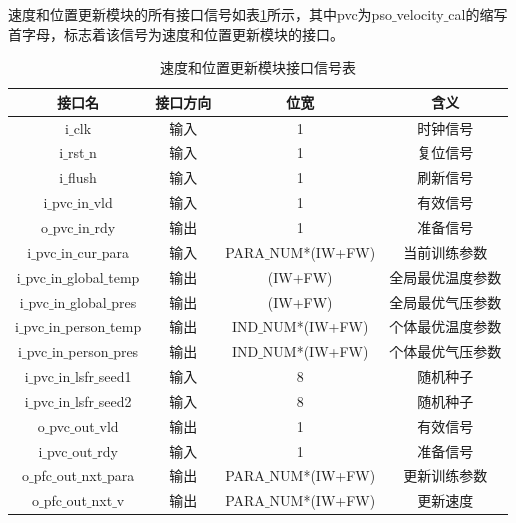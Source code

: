 速度和位置更新模块的所有接口信号如表\ref{tab:速度和位置更新模块接口信号表}所示，其中pvc为pso$\_$velocity$\_$cal的缩写首字母，标志着该信号为速度和位置更新模块的接口。

\begin{table}[htb]
    \centering
    \caption{速度和位置更新模块接口信号表}
    \label{tab:速度和位置更新模块接口信号表}
\begin{tabular}{c|c|c|c}
    \hline
    接口名                                          & 接口方向  & 位宽               &含义                        \\ \hline
    i$\_$clk                                       & 输入      & 1                     & 时钟信号             \\ \hline
    i$\_$rst$\_$n                                  & 输入      & 1                     & 复位信号             \\ \hline
    i$\_$flush                                     & 输入      & 1                     & 刷新信号             \\ \hline
    i$\_$pvc$\_$in$\_$vld                          & 输入      & 1                     & 有效信号        \\ \hline
    o$\_$pvc$\_$in$\_$rdy                          & 输出      & 1                     & 准备信号        \\ \hline
    i$\_$pvc$\_$in$\_$cur$\_$para                  & 输入      & PARA$\_$NUM*(IW+FW)   & 当前训练参数         \\ \hline
    i$\_$pvc$\_$in$\_$global$\_$temp               & 输出      & (IW+FW)               & 全局最优温度参数        \\ \hline
    i$\_$pvc$\_$in$\_$global$\_$pres               & 输出      & (IW+FW)               & 全局最优气压参数        \\ \hline
    i$\_$pvc$\_$in$\_$person$\_$temp               & 输出      & IND$\_$NUM*(IW+FW)    & 个体最优温度参数        \\ \hline
    i$\_$pvc$\_$in$\_$person$\_$pres               & 输出      & IND$\_$NUM*(IW+FW)    & 个体最优气压参数        \\ \hline
    i$\_$pvc$\_$in$\_$lsfr$\_$seed1                & 输入      & 8                     & 随机种子              \\ \hline
    i$\_$pvc$\_$in$\_$lsfr$\_$seed2                & 输入      & 8                     & 随机种子              \\ \hline


    o$\_$pvc$\_$out$\_$vld                         & 输出      & 1                     & 有效信号        \\ \hline
    i$\_$pvc$\_$out$\_$rdy                         & 输入      & 1                     & 准备信号        \\ \hline
    o$\_$pfc$\_$out$\_$nxt$\_$para                 & 输出      & PARA$\_$NUM*(IW+FW)   & 更新训练参数     \\ \hline
    o$\_$pfc$\_$out$\_$nxt$\_$v                    & 输出      & PARA$\_$NUM*(IW+FW)   & 更新速度         \\ \hline

\end{tabular}
\end{table}

